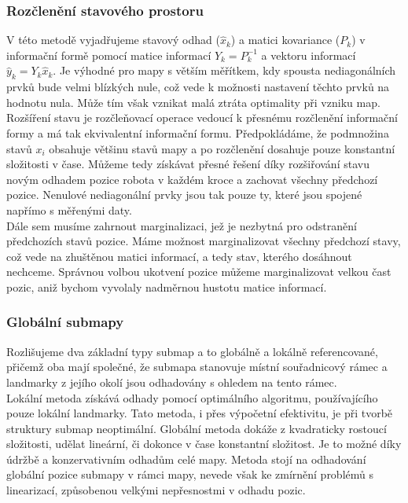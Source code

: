 \documentclass[11pt]{article}
\begin{document}
\subsubsection{Rozčlenění stavového prostoru}
V této metodě vyjadřujeme stavový odhad ($\hat{x}_k$) a matici kovariance ($P_k$) v informační formě pomocí matice informací $Y_k=P^{-1}_k$ a vektoru informací $\hat{y}_k=Y_k\hat{x}_k$. Je výhodné pro mapy s větším měřítkem, kdy spousta nediagonálních prvků bude velmi blízkých nule, což vede k možnosti nastavení těchto prvků na hodnotu nula. Může tím však vznikat malá ztráta optimality při vzniku map.\\
\indent Rozšíření stavu je rozčleňovací operace vedoucí k přesnému rozčlenění informační formy a má tak ekvivalentní informační formu. Předpokládáme, že podmnožina stavů $x_i$ obsahuje většinu stavů mapy a po rozčlenění dosahuje pouze konstantní složitosti v čase. Můžeme tedy získávat přesné řešení díky rozšiřování stavu novým odhadem pozice robota v každém kroce a zachovat všechny předchozí pozice. Nenulové nediagonální prvky jsou tak pouze ty, které jsou spojené napřímo s měřenými daty.\\
\indent Dále sem musíme zahrnout marginalizaci, jež je nezbytná pro odstranění předchozích stavů pozice. Máme možnost marginalizovat všechny předchozí stavy, což vede na zhuštěnou matici informací, a tedy stav, kterého dosáhnout nechceme. Správnou volbou ukotvení pozice můžeme marginalizovat velkou čast pozic, aniž bychom vyvolaly nadměrnou hustotu matice informací.

\subsubsection{Globální submapy}
Rozlišujeme dva základní typy submap a to globálně a lokálně referencované, přičemž oba mají společné, že submapa stanovuje místní souřadnicový rámec a landmarky z jejího okolí jsou odhadovány s ohledem na tento rámec.\\
\indent Lokální metoda získává odhady pomocí optimálního algoritmu, používajícího pouze lokální landmarky. Tato metoda, i přes výpočetní efektivitu, je při tvorbě struktury submap neoptimální. Globální metoda dokáže z kvadraticky rostoucí složitosti, udělat lineární, či dokonce v čase konstantní složitost. Je to možné díky údržbě a konzervativním odhadům celé mapy. Metoda stojí na odhadování globální pozice submapy v rámci mapy, nevede však ke zmírnění problémů s linearizací, způsobenou velkými nepřesnostmi v odhadu pozic.
\end{document}
